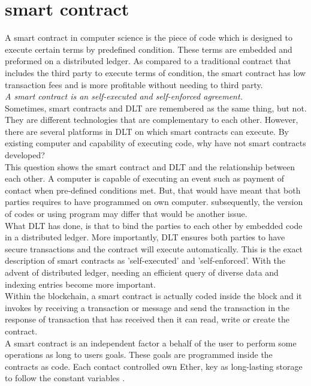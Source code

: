 \section{smart contract}
A smart contract in computer science is the piece of code which is designed to execute certain terms by predefined condition. These terms are embedded and preformed on a distributed ledger. As compared to a traditional contract that includes the third party to execute terms of condition, the smart contract has low transaction fees and is more profitable without needing to third party.\\
\textit{A smart contract is an self-executed and self-enforced agreement.}\\
Sometimes, smart contracts and DLT are remembered as the same thing, but not. They are different technologies that are complementary to each other. However, there are several platforms in DLT on which smart contracts can execute. By existing computer and capability of executing code, why have not smart contracts developed?\\
This question shows the smart contract and DLT and the relationship between each other.
A computer is capable of executing an event such as payment of contact when pre-defined conditions met. But, that would have meant that both parties requires to have programmed on own computer. subsequently, the version of codes or using program may differ that would be another issue. \\
What DLT has done, is that to bind the parties to each other by embedded code in a distributed ledger. More importantly, DLT ensures both parties to have secure transactions and the contract will execute automatically. This is the exact description of smart contracts as 'self-executed' and 'self-enforced'. 
With the advent of distributed ledger, needing an efficient query of diverse data and indexing entries become more important.\\
Within the blockchain, a smart contract is actually coded inside the block and it invokes by receiving a transaction or message and send the transaction in the response of transaction that has received then it can read, write or create the contract. \\
A smart contract is an independent factor a behalf of the user to perform some operations as long to users goals. These goals are programmed inside the contracts as code. Each contact controlled own Ether, key as long-lasting storage to follow the constant variables \cite{Egbertsen}.\\

